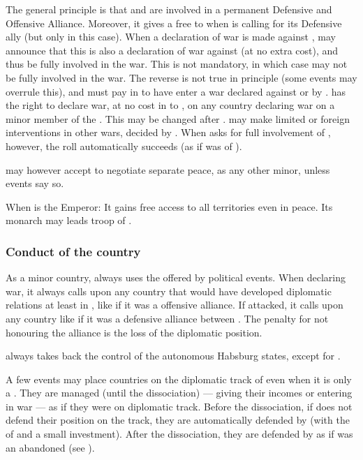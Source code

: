The general principle is that \SPA and  are
involved in a permanent Defensive and Offensive Alliance. Moreover, it
gives a free \CB to \SPA when  is calling for its
Defensive ally (but only in this case).
\bparag When a declaration of war is made against , \SPA may
announce that this is also a declaration of war against \SPA (at no
extra cost), and thus be fully involved in the war. This is not
mandatory, in which case \SPA may not be fully involved in the war.
\bparag The reverse is not true in principle (some events may overrule
this), and \SPA must pay in \STAB to have  enter a war
declared against or by \SPA.
\bparag {} has the right to declare war, at no cost in \STAB to
\SPA, on any country declaring war on a minor member of the \HRE.
This may be changed after .
\bparag {} may make limited or foreign interventions in
other wars, decided by \SPA.
\bparag When \SPA asks for full involvement of ,
however, the roll automatically succeeds (as if  was
\VASSAL of \SPA).

  may however accept to negotiate
separate peace, as any other minor, unless events say so.

 When \SPA is the Emperor:
\bparag It gains free access to all  territories even in
peace.
\bparag Its monarch may leads troop of \AUS.

\subsubsection{Conduct of the \hab country}
\aparag As a minor country,  always uses the \CB offered by
political events. When declaring war, it always calls upon any country
that would have developed diplomatic relations at least in \EW, like if
it was a \MAJ offensive alliance. If attacked, it calls upon any country
like if it was a defensive alliance between \MAJ. The penalty for not
honouring the alliance is the loss of the diplomatic position.

\aparag {} always takes back the control of the autonomous
Habsburg states, except for .

\aparag A few events may place countries on the diplomatic track of \HAB
even when it is only a \MIN. They are managed (until the dissociation)
--- giving their incomes or entering in war --- as if they were on \SPA
diplomatic track.
\bparag Before the dissociation, if \SPA does not defend their position
on the track, they are automatically defended by  (with
the \DIP of \SPA and a small investment).
\bparag After the dissociation, they are defended by \HAB as if \HAB was
an abandoned \MAJ (see ).

